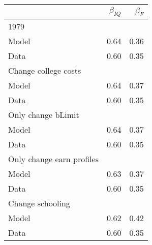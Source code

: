 \begin{tabular}{lrr}
\hline
  & $\beta_{IQ}$  & $\beta_{F}$  \\ 
\hline
1979 &   &   \\ 
Model & 0.64  & 0.36  \\ 
Data & 0.60  & 0.35  \\ 
Change college costs &   &   \\ 
Model & 0.64  & 0.37  \\ 
Data & 0.60  & 0.35  \\ 
Only change bLimit &   &   \\ 
Model & 0.64  & 0.37  \\ 
Data & 0.60  & 0.35  \\ 
Only change earn profiles &   &   \\ 
Model & 0.63  & 0.37  \\ 
Data & 0.60  & 0.35  \\ 
Change schooling &   &   \\ 
Model & 0.62  & 0.42  \\ 
Data & 0.60  & 0.35  \\ 
\hline
\end{tabular}%
